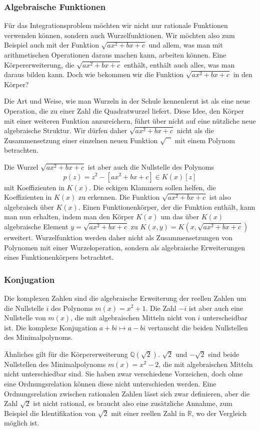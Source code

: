 %
%
\subsubsection{Algebraische Funktionen}
Für das Integrationsproblem möchten wir nicht nur rationale Funktionen
verwenden können, sondern auch Wurzelfunktionen.
Wir möchten also zum Beispiel auch mit der Funktion $\sqrt{ax^2+bx+c}$
und allem, was man mit arithmetischen Operationen daraus machen kann,
arbeiten können.
Eine Körpererweiterung, die $\sqrt{ax^2+bx+c}$ enthält, enthält auch
alles, was man daraus bilden kann.
Doch wie bekommen wir die Funktion $\sqrt{ax^2+bx+c}$ in den Körper?

Die Art und Weise, wie man Wurzeln in der Schule kennenlernt ist als
eine neue Operation, die zu einer Zahl die Quadratwurzel liefert.
Diese Idee, den Körper mit einer weiteren Funktion anzureichern,
führt über nicht auf eine nützliche neue algebraische Struktur.
Wir dürfen daher $\sqrt{ax^2+bx+c}$ nicht als die Zusammensetzung
einer einzelnen neuen Funktion $\sqrt{\phantom{A}}$ mit
einem Polynom betrachten.

Die Wurzel $\sqrt{ax^2+bx+c}$ ist aber auch die Nullstelle des Polynoms
\[
p(z)
=
z^2 - [ax^2+bx+c]
\in
K(x)[z]
\]
mit Koeffizienten in $K(x)$.
Die eckigen Klammern sollen helfen, die Koeffizienten in $K(x)$
zu erkennen.
Die Funktion $\sqrt{ax^2+bx+c}$ ist also algebraisch über $K(x)$.
Einen Funktionenkörper, der die Funktion enthält, kann man nun erhalten,
indem man den Körper $K(x)$ um das über $K(x)$ algebraische Element
$y=\sqrt{ax^2+bx+c}$ zu $K(x,y)=K(x,\sqrt{ax^2+bx+c})$ erweitert.
Wurzelfunktion werden daher nicht als Zusammensetzungen von Polynomen
mit einer Wurzeloperation, sondern als
algebraische Erweiterungen eines Funktionenkörpers betrachtet.

%
%
\subsubsection{Konjugation}
Die komplexen Zahlen sind die algebraische Erweiterung der reellen Zahlen
um die Nullstelle $i$ des Polynoms $m(x)=x^2+1$.
Die Zahl $-i$ ist aber auch eine Nullstelle von $m(x)$, die mit algebraischen
Mitteln nicht von $i$ unterscheidbar ist.
Die komplexe Konjugation $a+bi\mapsto a-bi$ vertauscht die beiden 
%
%
Nullstellen des Minimalpolynoms.

Ähnliches gilt für die Körpererweiterung $\mathbb{Q}(\!\sqrt{2})$.
$\sqrt{2}$ und $-\sqrt{2}$ sind beide Nullstellen des Minimalpolynoms
$m(x)=x^2-2$, die mit algebraischen Mitteln nicht unterschiedbar sind.
Sie haben zwar verschiedene Vorzeichen, doch ohne eine Ordnungsrelation
können diese nicht unterschieden werden.
%
Eine Ordnungsrelation zwischen rationalen Zahlen lässt sich zwar
definieren, aber die Zahl $\sqrt{2}$ ist nicht rational, es braucht
also eine zusätzliche Annahme, zum Beispiel die Identifikation von
$\sqrt{2}$ mit einer reellen Zahl in $\mathbb{R}$, wo der Vergleich
möglich ist.

